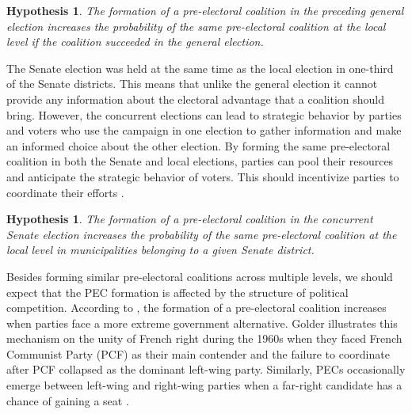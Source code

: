 \documentclass[fignum,12pt,titlepage]{article}
\newtheorem{hypo}{Hypothesis}
\newtheorem{subhypo}{Hypothesis}
\begin{document}
\begin{subhypo}
{The formation of a pre-electoral coalition in the preceding general election increases the probability of the same pre-electoral coalition at the local level if the coalition succeeded in the general election.\label{hyp:1.1}}
\end{subhypo}





The Senate election was held at the same time as the local election in one-third of the Senate districts. This means that unlike the general election it cannot provide any information about the electoral advantage that a coalition should bring. However, the concurrent elections can lead to strategic behavior by parties and voters who use the campaign in one election to gather information and make an informed choice about the other election. By forming the same pre-electoral coalition in both the Senate and local elections, parties can pool their resources and anticipate the strategic behavior of voters. This should incentivize parties to coordinate their efforts \parencite{hicken2011}. 

\begin{hypo}
{The formation of a pre-electoral coalition in the concurrent Senate election increases the probability of the same pre-electoral coalition at the local level in municipalities belonging to a given Senate district.\label{hyp:2}}
\end{hypo}

Besides forming similar pre-electoral coalitions across multiple levels, we should expect that the PEC formation is affected by the structure of political competition. 
According to \textcite{golder2006}, the formation of a pre-electoral coalition increases when parties face a more extreme government alternative. Golder illustrates this mechanism on the unity of French right during the 1960s when they faced French Communist Party (PCF) as their main contender and the failure to coordinate after PCF collapsed as the dominant left-wing party. Similarly, PECs occasionally emerge between left-wing and right-wing parties when a far-right candidate has a chance of gaining a seat \parencite[73]{golder2006}. 
\end{document}
